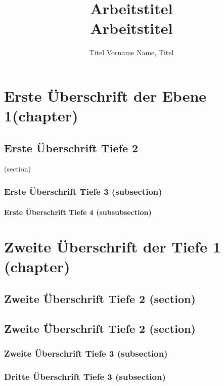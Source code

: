 \documentclass[Master, MBE, german]{twbook}
\title{Arbeitstitel\\Arbeitstitel}
\author{Titel Vorname Name, Titel}
\begin{document}
\maketitle

\Blinddocument

\chapter{Erste Überschrift der Ebene 1(chapter)}
\blinddocument

\blindmathpaper

\section{Erste Überschrift Tiefe 2}(section)
\blindtext 

\subsection{Erste Überschrift Tiefe 3 (subsection)}
\blindtext 

\subsubsection{Erste Überschrift Tiefe 4 (subsubsection)}
\blindtext

\chapter{Zweite Überschrift der Tiefe 1 (chapter)}
\blindtext  

\section{Zweite Überschrift Tiefe 2 (section)}
\blindtext  

\section{Zweite Überschrift Tiefe 2 (section)}
\blindtext 

\subsection{Zweite Überschrift Tiefe 3 (subsection)}
\blindtext 

\subsection{Dritte Überschrift Tiefe 3 (subsection)}
\blindtext 
 
\end{document}
